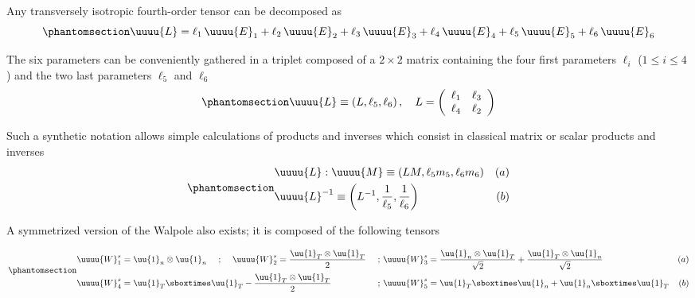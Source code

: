 \documentclass[
  letterpaper,
  DIV=11,
  numbers=noendperiod]{scrreprt}
\begin{document}
Any transversely isotropic fourth-order tensor can be decomposed as
\begin{equation}\phantomsection\label{eq-decWalpole}{
{\uuuu{L}} = {\ell}_{1}\,{\uuuu{E}}_{1} + {\ell}_{2}\,{\uuuu{E}}_{2} +
{\ell}_{3}\,{\uuuu{E}}_{3}+ {\ell}_{4}\,{\uuuu{E}}_{4}+ {\ell}_{5}\,{\uuuu{E}}_{5}+
{\ell}_{6}\,{\uuuu{E}}_{6}
}\end{equation}

The six parameters can be conveniently gathered in a triplet composed of
a \(2 \times 2\) matrix containing the four first parameters \(\ell_i\)
(\(1\leq i \leq 4\)) and the two last parameters \(\ell_5\) and
\(\ell_6\) \begin{equation}\phantomsection\label{eq-syntWalpole}{
\uuuu{L} \equiv \left( L , {\ell}_{5} , {\ell}_{6}
\right) , \quad
L = \left(
      \begin{array}{cc}
        {\ell}_{1} & {\ell}_{3} \\
        {\ell}_{4} & {\ell}_{2} \\
      \end{array}
    \right)
}\end{equation}

Such a synthetic notation allows simple calculations of products and
inverses which consist in classical matrix or scalar products and
inverses
\begin{equation}\phantomsection\label{eq-calWalpole}{\begin{aligned}
& \uuuu{L} : \uuuu{M} \equiv \left( L M , {\ell}_{5} m_5 , {\ell}_{6} m_6
\right)
&(a) \\
& {\uuuu{L}}^{-1} \equiv \left( {L}^{-1} , \frac{1}{{\ell}_{5}} , \frac{1}{{\ell}_{6}}
\right)
&(b)
\end{aligned}}\end{equation}

A symmetrized version of the Walpole also exists; it is composed of the
following tensors

\begin{equation}\phantomsection\label{eq-symWalpoleBasis}{\begin{aligned}
& \uuuu{W}^s_1=\uu{1}_n\otimes\uu{1}_n
\quad\textrm{ ; }\quad
\uuuu{W}^s_2=\frac{\uu{1}_T\otimes\uu{1}_T}{2}
&\textrm{ ; }&
\uuuu{W}^s_3=\frac{\uu{1}_n\otimes\uu{1}_T}{\sqrt{2}}+\frac{\uu{1}_T\otimes\uu{1}_n}{\sqrt{2}}
&(a) \\
& \uuuu{W}^s_4=\uu{1}_T\sboxtimes\uu{1}_T-\frac{\uu{1}_T\otimes\uu{1}_T}{2}
&\textrm{ ; }&
\uuuu{W}^s_5=\uu{1}_T\sboxtimes\uu{1}_n+\uu{1}_n\sboxtimes\uu{1}_T
&(b)
\end{aligned}}\end{equation}
\end{document}
